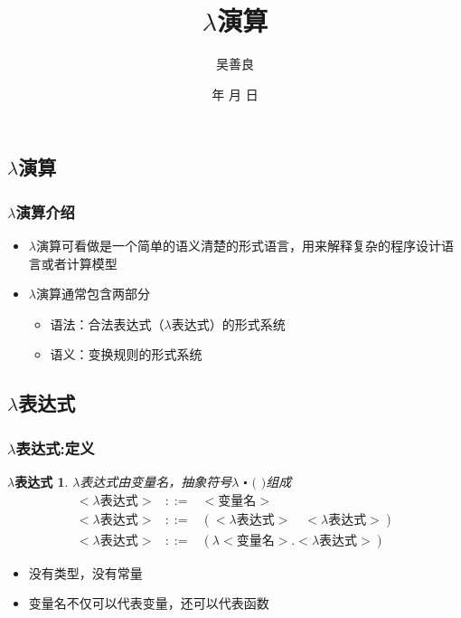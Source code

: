 \documentclass[CJKutf8,compress,hyperref]{beamer}
\renewcommand{\today}{\number\year 年 \number\month 月 \number\day 日}
\begin{document}
\begin{CJK}{UTF8}{song}
 
\title{$\lambda$演算}
\author{吴善良}
\date{ \today}

\frame{\titlepage}
\tableofcontents
\section{$\lambda$演算}

\begin{frame}
  \frametitle{$\lambda$演算介绍}
  \begin{itemize}
  \item $\lambda$演算可看做是一个简单的语义清楚的形式语言，用来解释复杂的程序设计语言或者计算模型
  \item $\lambda$演算通常包含两部分
    \begin{itemize} 
    \item{语法}：合法表达式（{\color{red}$\lambda$}表达式）的形式系统
    \item{语义}：变换规则的形式系统
    \end{itemize}
  \end{itemize}
\end{frame}

\subsection{ $\lambda$表达式}

\begin{frame}
  \frametitle{$\lambda$表达式:定义}
  \newtheorem{LE}{$\lambda$表达式} 
  \begin{LE}
    $\lambda$表达式由变量名，抽象符号$\lambda$  $\centerdot$  $($  $)$组成 
    \begin{eqnarray*}
      <\textrm{$\lambda$表达式}> & ::= & <\textrm{变量名}> \\
      <\textrm{$\lambda$表达式}> & ::= & (<\textrm{$\lambda$表达式}>\quad<\textrm{$\lambda$表达式}>) \\ 
      <\textrm{$\lambda$表达式}> & ::= & (\lambda<\textrm{变量名}>.<\textrm{$\lambda$表达式}>)  
    \end{eqnarray*} 
  \end{LE}      
  \begin{itemize}
  \item 没有类型，没有常量 
  \item 变量名不仅可以代表变量，还可以代表{\color{red}函数}
  \end{itemize}
\end{frame}


\end{CJK}
\end{document}
